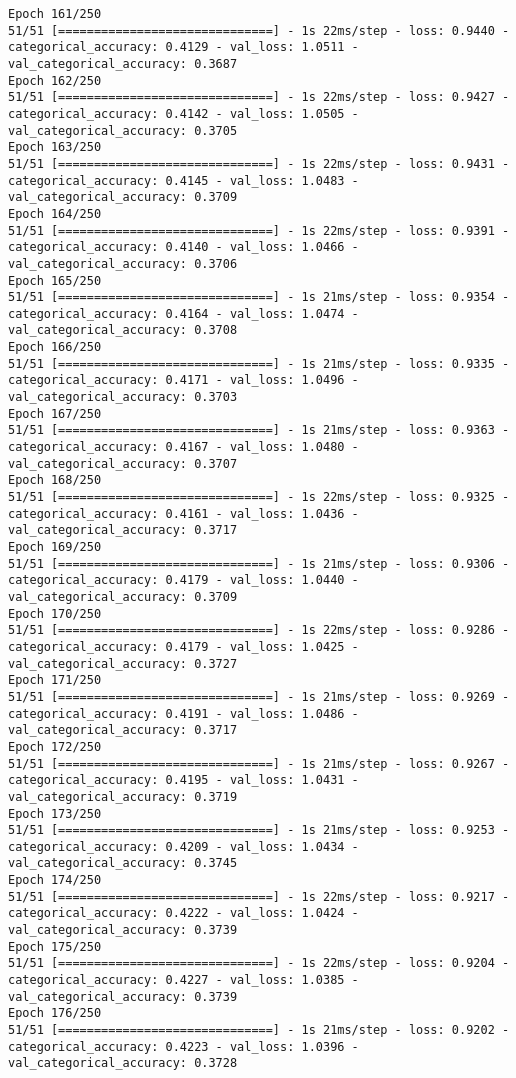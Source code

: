 \begin{lstlisting}
Epoch 161/250
51/51 [==============================] - 1s 22ms/step - loss: 0.9440 - categorical_accuracy: 0.4129 - val_loss: 1.0511 - val_categorical_accuracy: 0.3687
Epoch 162/250
51/51 [==============================] - 1s 22ms/step - loss: 0.9427 - categorical_accuracy: 0.4142 - val_loss: 1.0505 - val_categorical_accuracy: 0.3705
Epoch 163/250
51/51 [==============================] - 1s 22ms/step - loss: 0.9431 - categorical_accuracy: 0.4145 - val_loss: 1.0483 - val_categorical_accuracy: 0.3709
Epoch 164/250
51/51 [==============================] - 1s 22ms/step - loss: 0.9391 - categorical_accuracy: 0.4140 - val_loss: 1.0466 - val_categorical_accuracy: 0.3706
Epoch 165/250
51/51 [==============================] - 1s 21ms/step - loss: 0.9354 - categorical_accuracy: 0.4164 - val_loss: 1.0474 - val_categorical_accuracy: 0.3708
Epoch 166/250
51/51 [==============================] - 1s 21ms/step - loss: 0.9335 - categorical_accuracy: 0.4171 - val_loss: 1.0496 - val_categorical_accuracy: 0.3703
Epoch 167/250
51/51 [==============================] - 1s 21ms/step - loss: 0.9363 - categorical_accuracy: 0.4167 - val_loss: 1.0480 - val_categorical_accuracy: 0.3707
Epoch 168/250
51/51 [==============================] - 1s 22ms/step - loss: 0.9325 - categorical_accuracy: 0.4161 - val_loss: 1.0436 - val_categorical_accuracy: 0.3717
Epoch 169/250
51/51 [==============================] - 1s 21ms/step - loss: 0.9306 - categorical_accuracy: 0.4179 - val_loss: 1.0440 - val_categorical_accuracy: 0.3709
Epoch 170/250
51/51 [==============================] - 1s 22ms/step - loss: 0.9286 - categorical_accuracy: 0.4179 - val_loss: 1.0425 - val_categorical_accuracy: 0.3727
Epoch 171/250
51/51 [==============================] - 1s 21ms/step - loss: 0.9269 - categorical_accuracy: 0.4191 - val_loss: 1.0486 - val_categorical_accuracy: 0.3717
Epoch 172/250
51/51 [==============================] - 1s 21ms/step - loss: 0.9267 - categorical_accuracy: 0.4195 - val_loss: 1.0431 - val_categorical_accuracy: 0.3719
Epoch 173/250
51/51 [==============================] - 1s 21ms/step - loss: 0.9253 - categorical_accuracy: 0.4209 - val_loss: 1.0434 - val_categorical_accuracy: 0.3745
Epoch 174/250
51/51 [==============================] - 1s 22ms/step - loss: 0.9217 - categorical_accuracy: 0.4222 - val_loss: 1.0424 - val_categorical_accuracy: 0.3739
Epoch 175/250
51/51 [==============================] - 1s 22ms/step - loss: 0.9204 - categorical_accuracy: 0.4227 - val_loss: 1.0385 - val_categorical_accuracy: 0.3739
Epoch 176/250
51/51 [==============================] - 1s 21ms/step - loss: 0.9202 - categorical_accuracy: 0.4223 - val_loss: 1.0396 - val_categorical_accuracy: 0.3728

\end{lstlisting}
